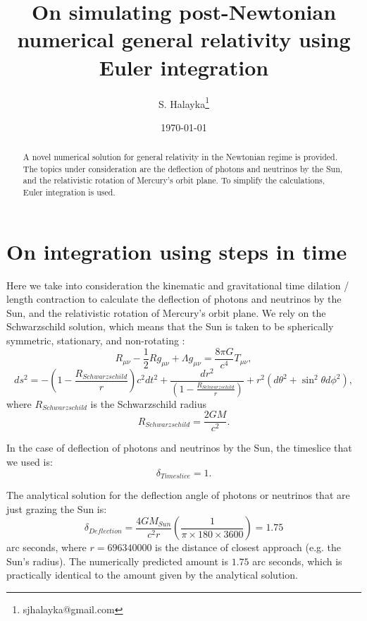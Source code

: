 \documentclass[12pt]{article}
\title{On simulating post-Newtonian numerical general relativity using Euler integration}
\author{S. Halayka\footnote{sjhalayka@gmail.com}}
\date{\today\;\currenttime}
\begin{document}
 
\maketitle

\begin{abstract}
A novel numerical solution for general relativity in the Newtonian regime is provided.
The topics under consideration are the deflection of photons and neutrinos by the Sun, and the relativistic rotation of Mercury's orbit plane.
To simplify the calculations, Euler integration is used.
\end{abstract}





\section{On integration using steps in time}

Here we take into consideration the kinematic and gravitational time dilation / length contraction to calculate the deflection of photons and neutrinos by the Sun, and the relativistic rotation of Mercury's orbit plane.
We rely on the Schwarzschild solution, which means that the Sun is taken to be spherically symmetric, stationary, and non-rotating \cite{misner}:
\begin{equation}
R_{\mu\nu} - \frac{1}{2} R g_{\mu\nu} + \Lambda g_{\mu\nu} = \frac{8\pi G}{c^4} T_{\mu\nu},
\end{equation}
\begin{equation}
ds^2 = -\left( 1 - \frac{R_{Schwarzschild}}{r} \right) c^2 dt^2 + \frac{dr^2}{\left( 1 - \frac{R_{Schwarzschild}}{r} \right)} + r^2 (d\theta^2 + \sin^2 \theta d\phi^2),
\end{equation}
where $R_{Schwarzschild}$ is the Schwarzschild radius
\begin{equation}
R_{Schwarzschild} = \frac{2GM}{c^2}.
\end{equation}

In the case of deflection of photons and neutrinos by the Sun, the timeslice that we used is:
\begin{equation}
\delta_{Timeslice} = 1.
\end{equation}



The analytical solution for the deflection angle of photons or neutrinos that are just grazing the Sun is:
\begin{equation}
\delta_{Deflection} = \frac{4GM_{Sun}}{c^2 r} \left( \frac{1}{\pi \times 180 \times 3600} \right) = 1.75
\end{equation}
arc seconds, where $r = 696340000$ is the distance of closest approach (e.g. the Sun's radius).
The numerically predicted amount is $1.75$ arc seconds, which is practically identical to the amount given by the analytical solution.
\end{document}
